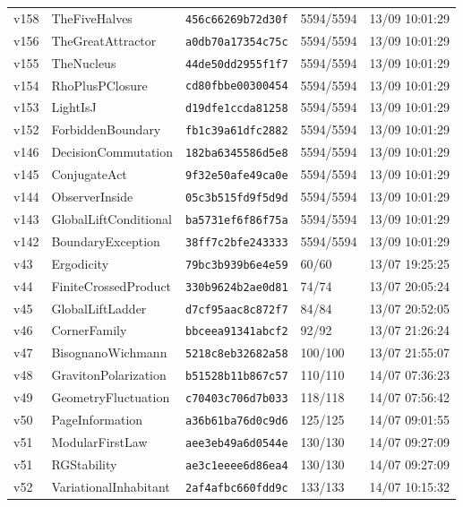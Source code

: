 \documentclass[11pt]{article}
\theoremstyle{definition}\newtheorem{deriv}{Derivation}
\begin{document}
{\begin{longtable}{@{}lllll@{}}
v158 & TheFiveHalves & \texttt{456c66269b72d30f} & 5594/5594 & 13/09 10:01:29 \\
v156 & TheGreatAttractor & \texttt{a0db70a17354c75c} & 5594/5594 & 13/09 10:01:29 \\
v155 & TheNucleus & \texttt{44de50dd2955f1f7} & 5594/5594 & 13/09 10:01:29 \\
v154 & RhoPlusPClosure & \texttt{cd80fbbe00300454} & 5594/5594 & 13/09 10:01:29 \\
v153 & LightIsJ & \texttt{d19dfe1ccda81258} & 5594/5594 & 13/09 10:01:29 \\
v152 & ForbiddenBoundary & \texttt{fb1c39a61dfc2882} & 5594/5594 & 13/09 10:01:29 \\
v146 & DecisionCommutation & \texttt{182ba6345586d5e8} & 5594/5594 & 13/09 10:01:29 \\
v145 & ConjugateAct & \texttt{9f32e50afe49ca0e} & 5594/5594 & 13/09 10:01:29 \\
v144 & ObserverInside & \texttt{05c3b515fd9f5d9d} & 5594/5594 & 13/09 10:01:29 \\
v143 & GlobalLiftConditional & \texttt{ba5731ef6f86f75a} & 5594/5594 & 13/09 10:01:29 \\
v142 & BoundaryException & \texttt{38ff7c2bfe243333} & 5594/5594 & 13/09 10:01:29 \\
v43 & Ergodicity & \texttt{79bc3b939b6e4e59} & 60/60 & 13/07 19:25:25 \\
v44 & FiniteCrossedProduct & \texttt{330b9624b2ae0d81} & 74/74 & 13/07 20:05:24 \\
v45 & GlobalLiftLadder & \texttt{d7cf95aac8c872f7} & 84/84 & 13/07 20:52:05 \\
v46 & CornerFamily & \texttt{bbceea91341abcf2} & 92/92 & 13/07 21:26:24 \\
v47 & BisognanoWichmann & \texttt{5218c8eb32682a58} & 100/100 & 13/07 21:55:07 \\
v48 & GravitonPolarization & \texttt{b51528b11b867c57} & 110/110 & 14/07 07:36:23 \\
v49 & GeometryFluctuation & \texttt{c70403c706d7b033} & 118/118 & 14/07 07:56:42 \\
v50 & PageInformation & \texttt{a36b61ba76d0c9d6} & 125/125 & 14/07 09:01:55 \\
v51 & ModularFirstLaw & \texttt{aee3eb49a6d0544e} & 130/130 & 14/07 09:27:09 \\
v51 & RGStability & \texttt{ae3c1eeee6d86ea4} & 130/130 & 14/07 09:27:09 \\
v52 & VariationalInhabitant & \texttt{2af4afbc660fdd9c} & 133/133 & 14/07 10:15:32 \\

\end{longtable}}
\end{document}
